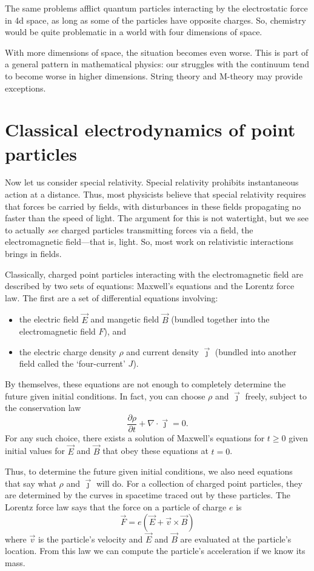 \documentclass[12pt]{article}
\begin{document}
The same problems afflict quantum particles interacting by the electrostatic force in 4d space, as long as some of the particles have opposite charges.   So, chemistry would be quite problematic in a world with four dimensions of space.  

With more dimensions of space, the situation becomes even worse.  This is part of a general pattern in mathematical physics: our struggles with the continuum tend to become worse in higher dimensions.  String theory and M-theory may provide exceptions.

\section{Classical electrodynamics of point particles}
\label{electrodynamics}

Now let us consider special relativity.  Special relativity prohibits instantaneous action at a distance.  Thus, most physicists believe that special relativity requires that forces be carried by fields, with disturbances in these fields propagating no faster than the speed of light.  The argument for this is not watertight, but we see to actually \emph{see} charged particles transmitting forces via a field, the electromagnetic field---that is, light.  So, most work on relativistic interactions brings in fields.

Classically, charged point particles interacting with the electromagnetic field are described by two sets of equations: Maxwell's equations and the Lorentz force law.  The first are a set of differential equations involving:
\begin{itemize}
\item the electric field $\vec E$ and mangetic field $\vec B$ (bundled together into the electromagnetic field $F$), and
\item the electric charge density $\rho$ and current density $\vec \jmath$ (bundled into another field called the `four-current' $J$). 
\end{itemize}
By themselves, these equations are not enough to completely determine the future given initial conditions.  In fact, you can choose $\rho$ and $\vec \jmath$ freely, subject
to the conservation law
\[   \frac{\partial \rho}{\partial t} + \nabla \cdot \vec \jmath = 0. \]
For any such choice, there exists a solution of Maxwell's equations for $t \ge 0$ given initial values for $\vec E$ and $\vec B$ that obey these equations at $t = 0$.  

Thus, to determine the future given initial conditions, we also need equations that say what $\rho$ and $\vec{\jmath}$ will do.  For a collection of charged point particles, they are determined by the curves in spacetime traced out by these particles.  The Lorentz force law says that the force on a particle of charge $e$ is
\[           \vec{F} = e (\vec{E} + \vec{v} \times \vec{B})  \]
where $\vec v$ is the particle's velocity and $\vec{E}$ and $\vec{B}$ are evaluated
at the particle's location.  From this law we can compute the particle's acceleration if we know its mass.   
\end{document}
